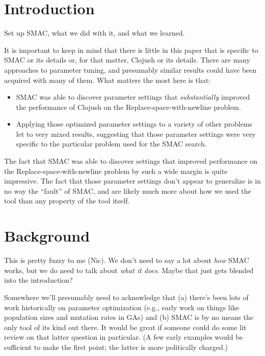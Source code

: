 \section{Introduction}
\label{sec:introduction}

Set up SMAC, what we did with it, and what we learned.

It is important to keep in mind that there is little in this paper that is
specific to SMAC or its details or, for that matter, Clojush or its details. 
There are many approaches to parameter
tuning, and presumably similar results could have been acquired with many of
them. What matters the most here is that:
\begin{itemize}
	\item SMAC was able to discover parameter settings that 
	\emph{substantially} improved the performance
	of Clojush on the Replace-space-with-newline problem.
	\item Applying those optimized parameter settings to a variety of other
	problems let to very mixed results, suggesting that those parameter
	settings were very specific to the particular problem used for the SMAC
	search.
\end{itemize}
The fact that SMAC was able to discover settings that improved
performance on the Replace-space-with-newline problem by such a wide margin
is quite impressive. The fact that those parameter settings don't appear to
generalize is in no way the ``fault'' of SMAC, and are likely much more 
about how we used the tool than any property of the tool itself.

\section{Background}
\label{sec:background}

This is pretty fuzzy to me (Nic). We don't need to say a lot about \emph{how}
SMAC works, but we do need to talk about \emph{what it does}. Maybe that just
gets blended into the introduction?

Somewhere we'll presumably need to acknowledge that (a) there's been lots of
work historically on parameter optimization (e.g., early work on things like
population sizes and mutation rates in GAs) and (b) SMAC is by no means the
only tool of its kind out there. It would be great if someone could do some
lit review on that latter question in particular. (A few early examples would
be sufficient to make the first point; the latter is more politically charged.)

